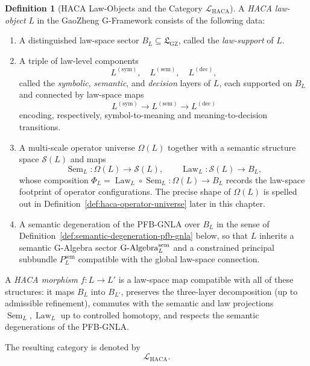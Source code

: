 \documentclass[11pt]{book}
\theoremstyle{plain}
\theoremstyle{definition}
\newtheorem{definition}[theorem]{Definition}
\theoremstyle{remark}
\newcommand{\GZLS}{\ensuremath{\mathfrak{L}_{\mathrm{GZ}}}}       \newcommand{\GZLT}{\ensuremath{M_{!w}}}                           \newcommand{\GZLOC}{\ensuremath{A_M}}                             \newcommand{\GZLC}{\ensuremath{\omega_{\mathrm{law}}}}            \newcommand{\GZLCurv}{\ensuremath{\mathcal{F}_{\mathrm{law}}}}
\begin{document}
\begin{definition}[HACA Law-Objects and the Category $\mathcal{L}_{\mathrm{HACA}}$]
\label{def:haca-law-objects-category}
A \emph{HACA law-object} $L$ in the GaoZheng G-Framework consists of the
following data:
\begin{enumerate}
  \item A distinguished law-space sector $B_L\subseteq\GZLS$, called the
        \emph{law-support} of $L$.
  \item A triple of law-level components
        \[
          L^{(\mathrm{sym})},\quad
          L^{(\mathrm{sem})},\quad
          L^{(\mathrm{dec})},
        \]
        called the \emph{symbolic}, \emph{semantic}, and
        \emph{decision} layers of $L$, each supported on $B_L$ and
        connected by law-space maps
        \[
          L^{(\mathrm{sym})}\longrightarrow L^{(\mathrm{sem})}
          \longrightarrow L^{(\mathrm{dec})}
        \]
        encoding, respectively, symbol-to-meaning and
        meaning-to-decision transitions.
  \item A multi-scale operator universe $\Omega(L)$ together with a
        semantic structure space $\mathcal{S}(L)$ and maps
        \[
          \operatorname{Sem}_L:\Omega(L)\to\mathcal{S}(L),
          \qquad
          \operatorname{Law}_L:\mathcal{S}(L)\to B_L,
        \]
        whose composition
        $\Phi_L=\operatorname{Law}_L\circ\operatorname{Sem}_L:
         \Omega(L)\to B_L$
        records the law-space footprint of operator configurations. The
        precise shape of $\Omega(L)$ is spelled out in
        Definition~\ref{def:haca-operator-universe} later in this
        chapter.
  \item A semantic degeneration of the PFB-GNLA over $B_L$ in the sense
        of Definition~\ref{def:semantic-degeneration-pfb-gnla} below,
        so that $L$ inherits a semantic G-Algebra sector
        $\text{G-Algebra}^{\mathrm{sem}}_L$ and a constrained principal
        subbundle $P^{\mathrm{sem}}_L$ compatible with the global
        law-space connection.
\end{enumerate}
A \emph{HACA morphism} $f:L\to L'$ is a law-space map compatible with
all of these structures: it maps $B_L$ into $B_{L'}$, preserves the
three-layer decomposition (up to admissible refinement),
commutes with the semantic and law projections
$\operatorname{Sem}_L,\operatorname{Law}_L$ up to controlled homotopy,
and respects the semantic degenerations of the PFB-GNLA.

The resulting category is denoted by
\[
  \mathcal{L}_{\mathrm{HACA}}.
\]
\end{definition}
\end{document}
